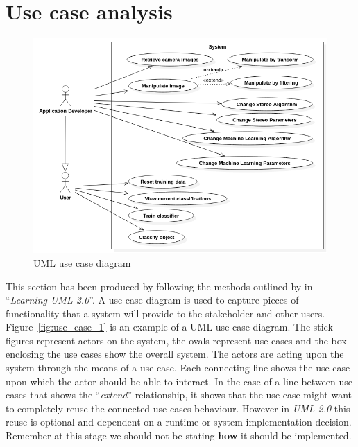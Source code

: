 \documentclass[11pt,oneside]{report}
\begin{document}
		\section{Use case analysis}
			\begin{figure}[ht]
			\begin{center}
    			\includegraphics[scale=0.45]{use_case_1}
    			\caption{UML use case diagram \protect {\label{fig:use_case_1}}}
    		\end{center}
			\end{figure}	
			This section has been produced by following the methods outlined by  in ``\textit{Learning UML 2.0}''.
			A use case diagram is used to capture pieces of functionality that a system will provide to the stakeholder and other users.
			Figure~\ref{fig:use_case_1} is an example of a UML use case diagram.
			The stick figures represent actors on the system, the ovals represent use cases and the box enclosing the use cases show the overall system. 
			The actors are acting upon the system through the means of a use case.
			Each connecting line shows the use case upon which the actor should be able to interact.
			In the case of a line between use cases that shows the ``\textit{extend}'' relationship, it shows that the use case might want to completely reuse the connected use cases behaviour.
			However in \textit{UML 2.0} this reuse is optional and dependent on a runtime or system implementation decision.
			Remember at this stage we should not be stating \textbf{how} it should be implemented.
			
			
			
		\clearpage
\end{document}
